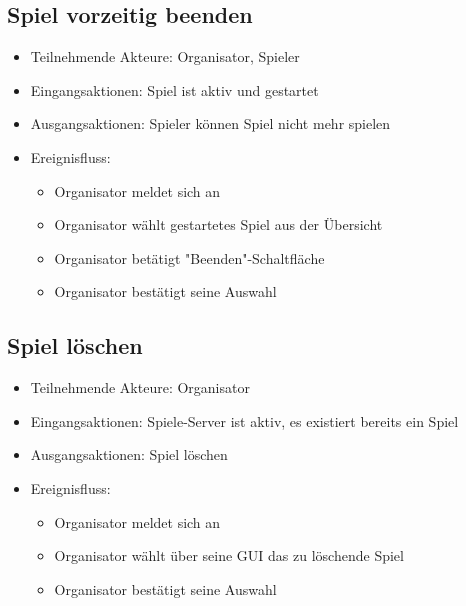 \documentclass[a4paper]{scrreprt}
\begin{document}
    \subsection{Spiel vorzeitig beenden}
    \begin{itemize}
        \item Teilnehmende Akteure: \Gls{Organisator}, \Gls{Spieler}
        \item Eingangsaktionen: Spiel ist aktiv und gestartet
        \item Ausgangsaktionen: Spieler können Spiel nicht mehr spielen %
        \item Ereignisfluss:
        \begin{itemize}
            \item Organisator meldet sich an
            \item Organisator wählt gestartetes Spiel aus der Übersicht
            \item Organisator betätigt "Beenden"-Schaltfläche
            \item Organisator bestätigt seine Auswahl
        \end{itemize}
    \end{itemize}

    \subsection{Spiel löschen}
    \begin{itemize}
        \item Teilnehmende Akteure: \Gls{Organisator}
        \item Eingangsaktionen: Spiele-Server ist aktiv, es existiert bereits ein Spiel
        \item Ausgangsaktionen: Spiel löschen
        \item Ereignisfluss:
        \begin{itemize}
            \item Organisator meldet sich an
            \item Organisator wählt über seine GUI das zu löschende Spiel
            \item Organisator bestätigt seine Auswahl
        \end{itemize}
    \end{itemize}
\end{document}
